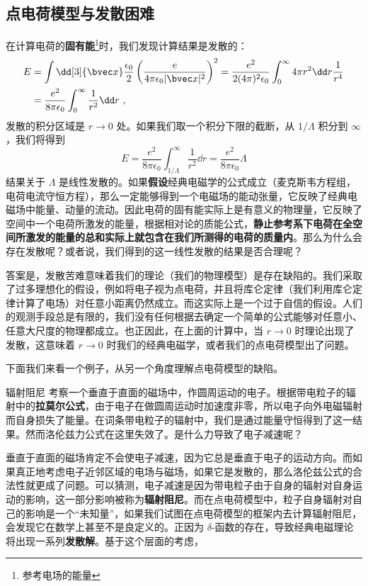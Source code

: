 
\subsection{点电荷模型与发散困难}
在计算电荷的\textbf{固有能}\footnote{参考电场的能量}时，我们发现计算结果是发散的：
\begin{equation}\label{elecdb_eq1}
\begin{aligned}
E&=\int \dd[3]{\bvec x}\frac{\epsilon_0}{2} \left(\frac{e}{4\pi\epsilon_0 |\bvec x|^2}\right)^2=\frac{e^2}{2(4\pi)^2\epsilon_0}\int_0^\infty 4\pi r^2\dd r \frac{1}{r^4}\\
&=\frac{e^2}{8\pi\epsilon_0} \int_0^\infty \frac{1}{r^2}\dd r~,
\end{aligned}
\end{equation}
发散的积分区域是 $r\rightarrow 0$ 处。如果我们取一个积分下限的截断，从 $1/\Lambda$ 积分到 $\infty$，我们将得到
\begin{equation}
E=\frac{e^2}{8\pi\epsilon_0}\int_{1/\Lambda}^{\infty} \frac{1}{r^2}\dd r=\frac{e^2}{8\pi\epsilon_0}\Lambda
\end{equation}
结果关于 $\Lambda$ 是线性发散的。如果\textbf{假设}经典电磁学的公式成立（麦克斯韦方程组，电荷电流守恒方程），那么一定能够得到一个电磁场的能动张量，它反映了经典电磁场中能量、动量的流动。因此电荷的固有能实际上是有意义的物理量，它反映了空间中一个电荷所激发的能量，根据相对论的质能公式，\textbf{静止参考系下电荷在全空间所激发的能量的总和实际上就包含在我们所测得的电荷的质量内}。那么为什么会存在发散呢？或者说，我们得到的这一线性发散的结果是否合理呢？

答案是，发散苦难意味着我们的理论（我们的物理模型）是存在缺陷的。我们采取了过多理想化的假设，例如将电子视为点电荷，并且将库仑定律（我们利用库仑定律计算了电场）对任意小距离仍然成立。而这实际上是一个过于自信的假设。人们的观测手段总是有限的，我们没有任何根据去确定一个简单的公式能够对任意小、任意大尺度的物理都成立。也正因此，在上面的计算中，当 $r\rightarrow 0$ 时理论出现了发散，这意味着 $r\rightarrow 0$ 时我们的经典电磁学，或者我们的点电荷模型出了问题。

下面我们来看一个例子，从另一个角度理解点电荷模型的缺陷。
\begin{example}{辐射阻尼}
考察一个垂直于直面的磁场中，作圆周运动的电子。根据带电粒子的辐射中的\textbf{拉莫尔公式}，由于电子在做圆周运动时加速度非零，所以电子向外电磁辐射而自身损失了能量。在词条带电粒子的辐射中，我们是通过能量守恒得到了这一结果。然而洛伦兹力公式在这里失效了。是什么力导致了电子减速呢？
\end{example}
垂直于直面的磁场肯定不会使电子减速，因为它总是垂直于电子的运动方向。而如果真正地考虑电子近邻区域的电场与磁场，如果它是发散的，那么洛伦兹公式的合法性就更成了问题。可以猜测，电子减速是因为带电粒子由于自身的辐射对自身运动的影响，这一部分影响被称为\textbf{辐射阻尼}。而在点电荷模型中，粒子自身辐射对自己的影响是一个“未知量”，如果我们试图在点电荷模型的框架内去计算辐射阻尼，会发现它在数学上甚至不是良定义的。正因为 $\delta$-函数的存在，导致经典电磁理论将出现一系列\textbf{发散解}。基于这个层面的考虑，

